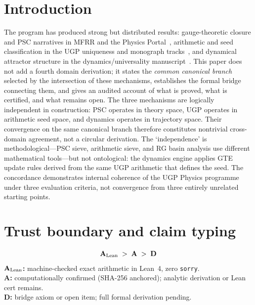 \documentclass[11pt,twocolumn]{article}
\newcommand{\CatA}{\textbf{A}}
\newcommand{\CatAL}{\ensuremath{\textbf{A}_{\rm Lean}}}
\newcommand{\CatD}{\textbf{D}}
\theoremstyle{remark}
\begin{document}
\tableofcontents

\section{Introduction}
The program has produced strong but distributed results: gauge-theoretic closure and PSC
narratives in MFRR and the Physics Portal~\cite{SpivackPhysicsPortal,SpivackNEMSMFRRBridge},
arithmetic and seed classification in the UGP uniqueness and monograph
tracks~\cite{Spivack2025_UGPUniqueness,spivack2025main_ugp_paper,Spivack2025_UGPMathFoundations},
and dynamical attractor structure in the dynamics/universality
manuscript~\cite{spivack2025dynamics_universality}.
This paper does not add a fourth domain derivation; it states the \emph{common canonical
branch} selected by the intersection of these mechanisms, establishes the formal bridge
connecting them, and gives an audited account of what is proved, what is certified, and
what remains open.
The three mechanisms are logically independent in construction: PSC operates in theory space,
UGP operates in arithmetic seed space, and dynamics operates in trajectory space.
Their convergence on the same canonical branch therefore constitutes nontrivial cross-domain
agreement, not a circular derivation.
The `independence' is methodological---PSC sieve, arithmetic sieve, and RG basin analysis
use different mathematical tools---but not ontological: the dynamics engine applies GTE
update rules derived from the same UGP arithmetic that defines the seed.
The concordance demonstrates internal coherence of the UGP Physics programme under three
evaluation criteria, not convergence from three entirely unrelated starting points.

\section{Trust boundary and claim typing}

\begin{tcolorbox}[colback=gray!4,colframe=gray!50!black,
  title={\textbf{Claim-strength taxonomy}},
  fonttitle=\bfseries,left=6pt,right=6pt,top=5pt,bottom=5pt]
\small
\[
\CatAL \;>\; \CatA \;>\; \CatD
\]
\textbf{$\CatAL$:} machine-checked exact arithmetic in Lean~4, zero \texttt{sorry}.\\
\textbf{$\CatA$:} computationally confirmed (SHA-256 anchored); analytic derivation or Lean cert remains.\\
\textbf{$\CatD$:} bridge axiom or open item; full formal derivation pending.
\end{tcolorbox}
\end{document}
